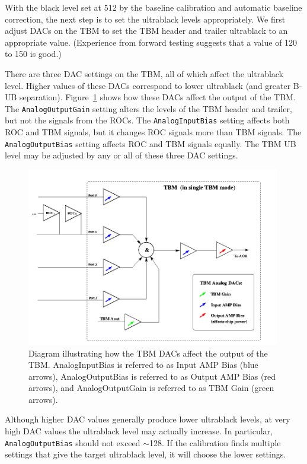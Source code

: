 With the black level set at 512 by the baseline calibration and automatic baseline correction, the next step is to set the ultrablack levels appropriately.  We first adjust DACs on the TBM to set the TBM header and trailer ultrablack to an appropriate value. (Experience from forward testing suggests that a value of 120 to 150 is good.)

There are three DAC settings on the TBM, all of which affect the ultrablack level.  Higher values of these DACs correspond to lower ultrablack (and greater B-UB separation).  Figure~\ref{fig:tbm-anal-dacs} shows how these DACs affect the output of the TBM.  The \verb|AnalogOutputGain| setting alters the levels of the TBM header and trailer, but not the signals from the ROCs.  The \verb|AnalogInputBias| setting affects both ROC and TBM signals, but it changes ROC signals more than TBM signals.  The \verb|AnalogOutputBias| setting affects ROC and TBM signals equally. The TBM UB level may be adjusted by any or all of these three DAC settings.

\begin{figure}
\begin{center}
 \includegraphics[width=0.99\textwidth]{tbm-anal-dacs.png}
\end{center}
\caption{Diagram illustrating how the TBM DACs affect the output of the TBM.
AnalogInputBias is referred to as Input AMP Bias (blue arrows),
AnalogOutputBias is referred to as Output AMP Bias (red arrows),
and AnalogOutputGain is referred to as TBM Gain (green arrows).}
\label{fig:tbm-anal-dacs}
\end{figure}

Although higher DAC values generally produce lower ultrablack levels, at very high DAC values the ultrablack level may actually increase.  In particular, \verb|AnalogOutputBias| should not exceed $\sim$128.  If the calibration finds multiple settings that give the target ultrablack level, it will choose the lower settings.

